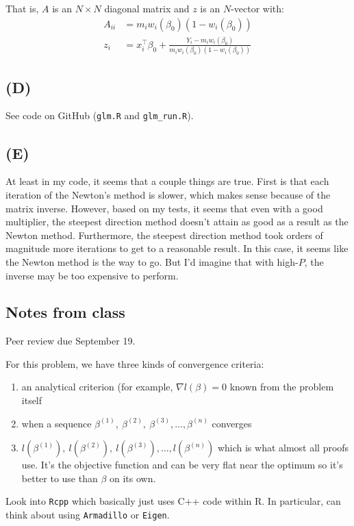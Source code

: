 \documentclass{article}
\begin{document}
That is, $A$ is an $N\times N$ diagonal matrix and $z$ is an $N$-vector with:
\begin{align*}
A_{ii}&=m_i w_i(\beta_0) (1-w_i(\beta_0))\\
z_i&=x_i^\top\beta_0+\frac{Y_i-m_i w_i(\beta_0)}{m_i w_i(\beta_0) (1-w_i(\beta_0))}
\end{align*}


\subsection{(D)}
See code on GitHub (\texttt{glm.R} and \texttt{glm\_run.R}).

\subsection{(E)}
At least in my code, it seems that a couple things are true. First is that each iteration of the Newton's method is slower,
which makes sense because of the matrix inverse. However, based on my tests, it seems that even with a good multiplier, the steepest direction method doesn't attain as good as a result as the Newton method. Furthermore, the
steepest direction method took orders of magnitude more iterations to get to a reasonable result. In this case, it seems
like the Newton method is the way to go. But I'd imagine that with high-$P$, the inverse may be too expensive to perform.

\subsection{Notes from class}
Peer review due September 19.

For this problem, we have three kinds of convergence criteria:
\begin{enumerate}[1.]
\item an analytical criterion (for example, $\nabla l(\beta)=0$ known from the problem itself
\item when a sequence $\beta^{(1)},~\beta^{(2)},~\beta^{(3)},\ldots,\beta^{(n)}$ converges
\item $l(\beta^{(1)}),~l(\beta^{(2)}),~l(\beta^{(3)}),\ldots,l(\beta^{(n)})$ which is what almost all proofs use. It's the objective function and can be very flat near the optimum so it's better to use than $\beta$ on its own.
\end{enumerate}

Look into \texttt{Rcpp} which basically just uses C++ code within R. In particular, can think about using
\texttt{Armadillo} or \texttt{Eigen}.
\end{document}
